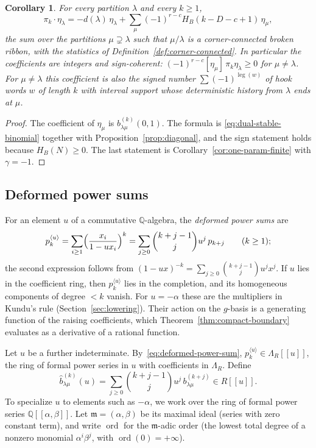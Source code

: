 \documentclass[11pt]{amsart}
\numberwithin{equation}{section}
\newtheorem{corollary}[theorem]{Corollary}
\theoremstyle{definition}
\theoremstyle{remark}
\newcommand{\Lam}{\Lambda}
\newcommand{\leg}{\operatorname{leg}}
\newcommand{\QQ}{\mathbb Q}
\begin{document}
\begin{corollary}\label{cor:K-homology}
For every partition $\lambda$ and every $k\geq1$,
\[
 \pi_k\cdot\eta_\lambda=-d(\lambda)\,\eta_\lambda
 +\sum_\mu(-1)^{r-c}H_B(k-D-c+1)\,\eta_\mu ,
\]
the sum over the partitions $\mu\supsetneq\lambda$ such that $\mu/\lambda$ is a
corner-connected broken ribbon, with the statistics of
Definition~\ref{def:corner-connected}. In particular the coefficients are
integers and sign-coherent: $(-1)^{r-c}[\eta_\mu]\,\pi_k\eta_\lambda\geq0$
for $\mu\neq\lambda$. For $\mu\neq\lambda$ this coefficient is also the signed
number $\sum(-1)^{\leg(w)}$ of hook words $w$ of length $k$ with interval
support whose deterministic history from $\lambda$ ends at $\mu$.
\end{corollary}

\begin{proof}
The coefficient of $\eta_\mu$ is $b^{(k)}_{\lambda\mu}(0,1)$. The formula is
\eqref{eq:dual-stable-binomial} together with Proposition~\ref{prop:diagonal},
and the sign statement holds because $H_B(N)\geq0$. The last statement is
Corollary~\ref{cor:one-param-finite} with $\gamma=-1$.
\end{proof}

\subsection{Deformed power sums}\label{sec:further}

For an element $u$ of a commutative $\QQ$-algebra, the \emph{deformed power
sums} are
\begin{equation}\label{eq:deformed-power-sum}
 p^{\langle u\rangle}_k=\sum_{i\geq1}\Bigl(\frac{x_i}{1-ux_i}\Bigr)^k
 =\sum_{j\geq0}\binom{k+j-1}{j}u^j\,p_{k+j}\qquad(k\geq1);
\end{equation}
the second expression follows from
$(1-ux)^{-k}=\sum_{j\geq0}\binom{k+j-1}{j}u^jx^j$. If $u$ lies in the
coefficient ring, then $p^{\langle u\rangle}_k$ lies in the completion, and
its homogeneous components of degree $<k$ vanish. For $u=-\alpha$ these are
the multipliers in Kundu's rule (Section~\ref{sec:lowering}). Their action
on the $g$-basis is a generating function of the raising coefficients,
which Theorem~\ref{thm:compact-boundary} evaluates as a derivative of a
rational function.

Let $u$ be a further indeterminate. By~\eqref{eq:deformed-power-sum},
$p^{\langle u\rangle}_k\in\Lam_R[[u]]$, the ring of formal power series in $u$
with coefficients in $\Lam_R$. Define
\begin{equation}\label{eq:deformed-b}
 \widehat b^{(k)}_{\lambda\mu}(u)
 =\sum_{j\geq0}\binom{k+j-1}{j}u^j\,b^{(k+j)}_{\lambda\mu}\in R[[u]] .
\end{equation}
To specialize $u$ to elements such as $-\alpha$, we work over the ring of formal
power series $\QQ[[\alpha,\beta]]$. Let $\mathfrak m=(\alpha,\beta)$ be its
maximal ideal (series with zero constant term), and write $\operatorname{ord}$
for the $\mathfrak m$-adic order (the lowest total degree of a nonzero monomial
$\alpha^i\beta^j$, with $\operatorname{ord}(0)=+\infty$).
\end{document}
